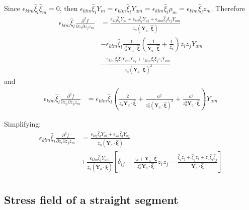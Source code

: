 \documentclass[10pt]{report}
\begin{document}
{Since   $\epsilon_{klm}\hat{\xi}_l\hat{\xi}_m=0$, then $\epsilon_{klm}\hat{\xi}_lY_m=\epsilon_{klm}\hat{\xi}_lY_{am}=\epsilon_{klm}\hat{\xi}_l\rho_m=\epsilon_{klm}\hat{\xi}_lz_m$. Therefore 
\begin{align}
\epsilon_{klm}\hat{\xi}_l\frac{\partial^3 f}{\partial  z_i\partial  z_j z_m}
&=\frac{\epsilon_{klj}\hat{\xi}_lY_{ai}+\epsilon_{kli}\hat{\xi}_lY_{aj}+\epsilon_{klm}\hat{\xi}_l\delta_{ij}Y_{am}}{z_a(\bm Y_a\cdot \hat{\bm \xi})}\\
&-\epsilon_{klm}\hat{\xi}_l\frac{1}{z_a^2\bm Y_a\cdot \hat{\bm \xi}}\left(\frac{1}{\bm Y_a\cdot \hat{\bm \xi}}+\frac{1}{z_a}\right)z_iz_jY_{am}\\
&-\frac{\epsilon_{klm}\hat{\xi}_l\hat{\xi}_iY_{am}Y_{aj}+\epsilon_{klm}\hat{\xi}_l\hat{\xi}_jz_iY_{am}}{z_a(\bm Y_a\cdot \hat{\bm \xi})^2}
\end{align}
and
\begin{align}
\epsilon_{klm}\hat{\xi}_l\frac{\partial^3 f}{\partial  z_p\partial  z_p z_m}&=\epsilon_{klm}\hat{\xi}_l\left(\frac{2}{z_a\bm Y_a\cdot \hat{\bm \xi}}+\frac{a^2}{z_a^2(\bm Y_a\cdot \hat{\bm \xi})^2}+\frac{a^2}{z_a^3 \bm Y_a\cdot \hat{\bm \xi}}\right)Y_{am}
\end{align}

Simplifying:
\begin{align}
\epsilon_{klm}\hat{\xi}_l\frac{\partial^3 f}{\partial  z_i\partial  z_j z_m}&=
\frac{\epsilon_{klj}\hat{\xi}_lY_{ai}+\epsilon_{kli}\hat{\xi}_lY_{aj}}{z_a(\bm Y_a\cdot \hat{\bm \xi})}\nonumber\\
&+\frac{\epsilon_{klm}\hat{\xi}_lY_{am}}{z_a(\bm Y_a\cdot \hat{\bm \xi})}\left[\delta_{ij}-\frac{z_a+\bm Y_a\cdot \hat{\bm \xi}}{z_a^2\bm Y_a\cdot \hat{\bm \xi}}z_iz_j-\frac{\hat{\xi}_iz_j+\hat{\xi}_jz_i+z_a\hat{\xi}_i\hat{\xi}_j}{\bm Y_a\cdot \hat{\bm \xi}}\right]\\
\end{align}


 
\subsection{Stress field of a straight segment}


}
\end{document}
